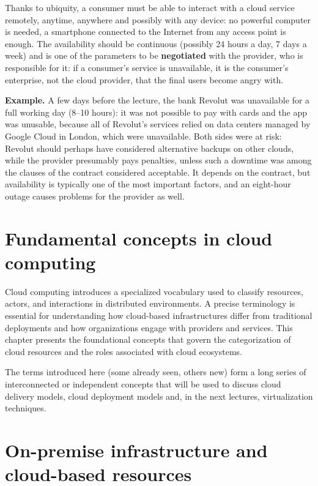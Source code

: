 Thanks to ubiquity, a consumer must be able to interact with a cloud service remotely, anytime, anywhere and possibly with any device: no powerful computer is needed, a smartphone connected to the Internet from any access point is enough. The availability should be continuous (possibly 24 hours a day, 7 days a week) and is one of the parameters to be \textbf{negotiated} with the provider, who is responsible for it: if a consumer's service is unavailable, it is the consumer's enterprise, not the cloud provider, that the final users become angry with.

\textbf{Example.} A few days before the lecture, the bank Revolut was unavailable for a full working day (8--10 hours): it was not possible to pay with cards and the app was unusable, because all of Revolut's services relied on data centers managed by Google Cloud in London, which were unavailable. Both sides were at risk: Revolut should perhaps have considered alternative backups on other clouds, while the provider presumably pays penalties, unless such a downtime was among the clauses of the contract considered acceptable. It depends on the contract, but availability is typically one of the most important factors, and an eight-hour outage causes problems for the provider as well.

\section{Fundamental concepts in cloud computing}

Cloud computing introduces a specialized vocabulary used to classify resources, actors, and interactions in distributed environments. A precise terminology is essential for understanding how cloud-based infrastructures differ from traditional deployments and how organizations engage with providers and services. This chapter presents the foundational concepts that govern the categorization of cloud resources and the roles associated with cloud ecosystems.

The terms introduced here (some already seen, others new) form a long series of interconnected or independent concepts that will be used to discuss cloud delivery models, cloud deployment models and, in the next lectures, virtualization techniques.

\section{On-premise infrastructure and cloud-based resources}

